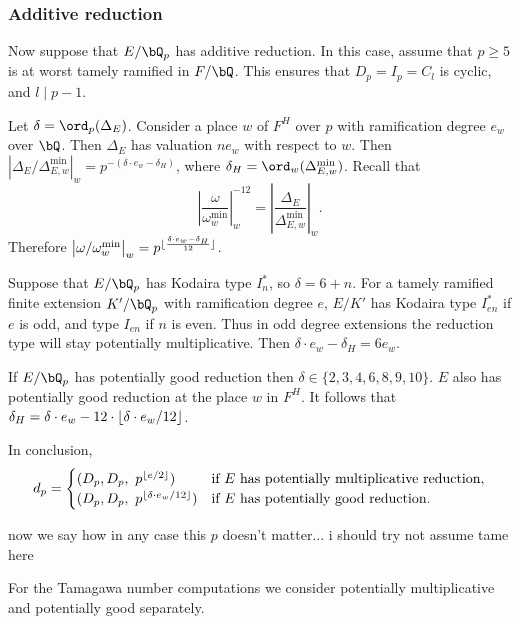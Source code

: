 \subsubsection*{Additive reduction}

Now suppose that $E / \bQ_p$ has additive reduction. In this case, assume that $p \geq 5$ is at worst tamely ramified in $F / \bQ$. This ensures that $D_p = I_p = C_l$ is cyclic, and $l \mid p - 1$.

Let $\delta = \ord_p(\Delta_E)$. Consider a place $w$ of $F^H$ over $p$ with ramification degree  $e_w$over $\bQ$. Then $\Delta_E$ has valuation $n e_w$ with respect to $w$. Then $\left| \Delta_E / \Delta_{E, w}^{\min} \right|_w = p^{-(\delta\cdot e_w - \delta_H)}$, where $\delta_H = \ord_w(\Delta_{E, w}^{\min})$.
Recall that
\[ \left| \frac{\omega}{\omega_{w}^{\min}} \right|_{w}^{-12} = \left| \frac{\Delta_E}{\Delta_{E, w}^{\min}} \right|_w .\] 
Therefore $\left| \omega / \omega_{w}^{\min} \right|_w = p^{\lfloor\frac{\delta\cdot e_w - \delta_H}{12}\rfloor}$.

Suppose that $E / \bQ_p$ has Kodaira type $I_n^*$, so $\delta = 6 + n$. For a tamely ramified finite extension $K' / \bQ_p$ with ramification degree $e$, $E / K'$ has Kodaira type $I_{en}^*$ if $e$ is odd, and type $I_{en}$ if $n$ is even. Thus in odd degree extensions the reduction type will stay potentially multiplicative. Then $\delta \cdot e_w - \delta_H = 6 e_w$.

If $E / \bQ_p$ has potentially good reduction then $\delta \in \{2,3,4,6,8,9,10 \}$. $E$ also has potentially good reduction at the place $w$ in $F^H$. It follows that $\delta_H = \delta \cdot e_w - 12 \cdot \lfloor\delta \cdot e_w /12\rfloor$.

In conclusion, 
\[ d_p = 
    \begin{cases}
        (D_p, D_p,\ p^{\lfloor e /2\rfloor}) & \text{if } E \text{ has potentially multiplicative reduction}, \\
        (D_p, D_p,\ p^{\lfloor\delta \cdot e_w/12\rfloor}) & \text{if } E \text { has potentially good reduction}.
    \end{cases}
    \]

{\color{red} now we say how in any case this $p$ doesn't matter... i should try not assume tame here}


For the Tamagawa number computations we consider potentially multiplicative and potentially good separately.


